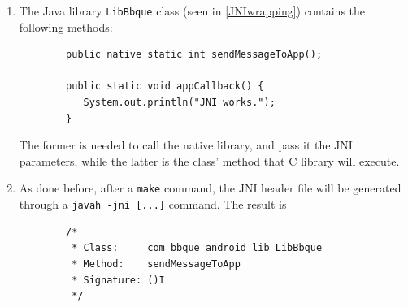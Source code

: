 \begin{enumerate}
	\item The Java library \texttt{LibBbque} class (seen in \ref{JNIwrapping}) contains the following methods:
	\begin{verbatim}
		public native static int sendMessageToApp();
		
		public static void appCallback() {
		   System.out.println("JNI works.");
		}
	\end{verbatim}
	The former is needed to call the native library, and pass it the JNI parameters, while the latter is the class' method that C library will execute.
	\item As done before, after a \texttt{make} command, the JNI header file will be generated through a \texttt{javah -jni [...]} command. The result is
	\begin{verbatim}
		/*
		 * Class:     com_bbque_android_lib_LibBbque
		 * Method:    sendMessageToApp
		 * Signature: ()I
		 */
		 

\end{verbatim}
\end{enumerate}
